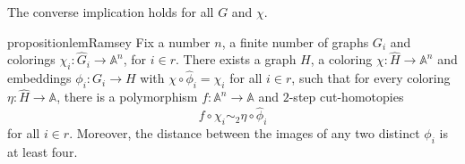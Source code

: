 \documentclass[oneside]{amsart}
\newcommand{\str}[1]{\mathbb{#1}}
\begin{document}
The converse implication holds for all $G$ and $\chi$.

\begin{restatable}{proposition}{lemRamsey}
\label{prop:homotopy_witness2}
    Fix a number $n$, a finite number of graphs
    $G_i$ and colorings $\chi_i\colon \hat G_i\to \str A^n$, for $i \in r$. There exists a graph $H$, a coloring $\chi\colon \hat H\to \str A^n$ and embeddings $\phi_i\colon G_i\to H$ with $\chi\circ\hat\phi_i = \chi_i$ for all $i \in r$, such that for every coloring $\eta\colon\hat H\to \str A$, there is a polymorphism $f\colon \str A^n\to \str A$ and $2$-step cut-homotopies
    $$
    f\circ \chi_i \sim_2 \eta\circ\hat\phi_i
    $$
    for all $i \in r$.
    Moreover, the distance between the images of any two distinct $\phi_i$ is at least four.
\end{restatable}
\end{document}
